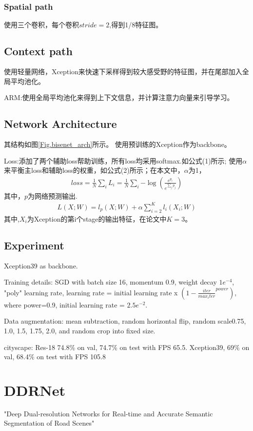 \documentclass{article}
\begin{document}
\subsubsection{Spatial path}
使用三个卷积，每个卷积$stride=2$,得到1/8特征图。
\subsection{Context path}
使用轻量网络，Xception来快速下采样得到较大感受野的特征图，并在尾部加入全局平均池化。

ARM:使用全局平均池化来得到上下文信息，并计算注意力向量来引导学习。

\subsection{Network Architecture}
其结构如图\ref{Fig.bisenet_arch}所示。 使用预训练的Xception作为backbone。

Loss:添加了两个辅助loss帮助训练，所有loss均采用softmax.如公式(1)所示; 使用$\alpha$来平衡主loss和辅助loss的权重，如公式(2)所示；在本文中，$\alpha$为1，
\begin{align}
loss  = \frac{1}{N} \sum_i{L_i} = \frac{1}{N	}\sum_i{-\log{(\frac{e^{p_i}}{e^{\sum_j{p_j}}})}}
\end{align}
其中，$p$为网络预测输出.
\begin{align}
L(X;W) = l_p(X;W) + \alpha \sum_{i=2}^{K}l_i(X_i;W)
\end{align}
其中,$X_i$为Xception的第i个stage的输出特征，在论文中$K=3$。

\subsection{Experiment}
Xception39 as backbone.

Training details: SGD with batch size 16, momentum 0.9, weight decay $1e^{-4}$, "poly" learning rate, learning rate = initial learning rate x $(1 - \frac{iter}{max_iter}^{power})$, where power=0.9,  initial learning rate = $2.5e^{-2}$.

Data augmentation: mean subtraction, random horizontal flip, random scale{0.75, 1.0, 1.5, 1.75, 2.0}, and random crop into fixed size.

cityscape: Res-18 74.8\% on val, 74.7\% on test with FPS 65.5. Xception39, 69\% on val, 68.4\% on test with FPS 105.8


\section{DDRNet}
"Deep Dual-resolution Networks for Real-time and Accurate Semantic Segmentation of Road Scenes"\cite{hong2021deep}
\end{document}
